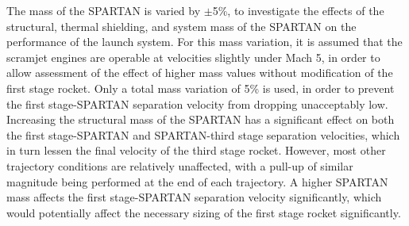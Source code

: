 The mass of the SPARTAN is varied by $\pm$5\%, to investigate the effects of the structural, thermal shielding, and system mass of the SPARTAN on the performance of the launch system. For this mass variation, it is assumed that the scramjet engines are operable at velocities slightly under Mach 5, in order to allow assessment of the effect of higher mass values without modification of the first stage rocket. Only a total mass variation of 5\% is used, in order to prevent the first stage-SPARTAN separation velocity from dropping unacceptably low. Increasing the structural mass of the SPARTAN has a significant effect on both the first stage-SPARTAN and SPARTAN-third stage separation velocities, which in turn lessen the final velocity of the third stage rocket. However, most other trajectory conditions are relatively unaffected, with a pull-up of similar magnitude being performed at the end of each trajectory. 
A higher SPARTAN mass affects the first stage-SPARTAN separation velocity significantly, which would potentially affect the necessary sizing of the first stage rocket significantly. 





